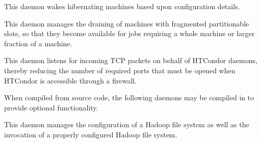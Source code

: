 \begin{description}
\item[\Condor{rooster}] This daemon wakes hibernating machines based
upon configuration details.

\item[\Condor{defrag}] This daemon manages the draining of machines
with fragmented partitionable slots, so that they become available
for jobs requiring a whole machine or larger fraction of a machine.

\item[\Condor{shared\_port}] This daemon listens for incoming TCP packets
on behalf of HTCondor daemons, thereby reducing the number of required
ports that must be opened when HTCondor is accessible through a firewall. 

\end{description} 

When compiled from source code,
the following daemons may be compiled in to provide optional functionality.
\begin{description} 

\item[\Condor{hdfs}] This daemon manages the configuration of a
Hadoop file system as well as the invocation of a properly configured
Hadoop file system.

\end{description}

